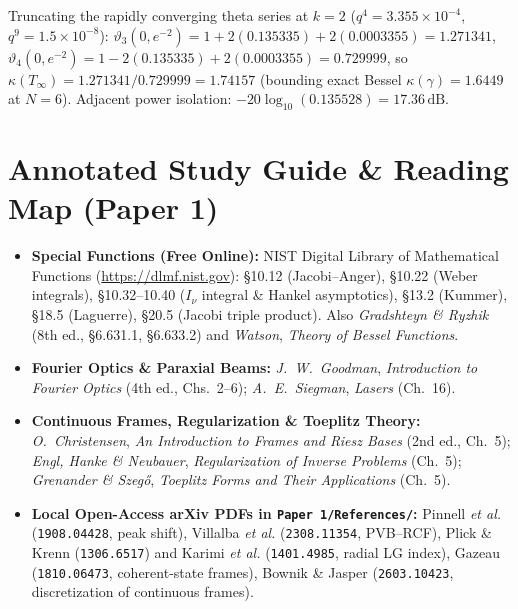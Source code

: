 \documentclass[10pt,letterpaper]{article}
\numberwithin{equation}{section}
\begin{document}
\begin{pencheck}[Hand Arithmetic at $\Delta R = 2.0\,w$ ($q = e^{-2} = 0.135335$)]
Truncating the rapidly converging theta series at $k = 2$ ($q^4 = 3.355\times 10^{-4}$, $q^9 = 1.5\times 10^{-8}$):
$\vartheta_3(0,e^{-2}) = 1 + 2(0.135335) + 2(0.0003355) = 1.271341$, $\vartheta_4(0,e^{-2}) = 1 - 2(0.135335) + 2(0.0003355) = 0.729999$, so $\kappa(T_\infty) = 1.271341/0.729999 = \mathbf{1.74157}$ (bounding exact Bessel $\kappa(\gamma) = 1.6449$ at $N=6$). Adjacent power isolation: $-20\log_{10}(0.135528) = \mathbf{17.36\,\mathrm{dB}}$.
\end{pencheck}

\section*{Annotated Study Guide \& Reading Map (Paper 1)}
\begin{itemize}[leftmargin=1.4em,itemsep=2pt]
  \item \textbf{Special Functions (Free Online):} NIST Digital Library of Mathematical Functions (\url{https://dlmf.nist.gov}): \S10.12 (Jacobi--Anger), \S10.22 (Weber integrals), \S10.32--10.40 ($I_\nu$ integral \& Hankel asymptotics), \S13.2 (Kummer), \S18.5 (Laguerre), \S20.5 (Jacobi triple product). Also \emph{Gradshteyn \& Ryzhik} (8th ed., \S6.631.1, \S6.633.2) and \emph{Watson}, \emph{Theory of Bessel Functions}.
  \item \textbf{Fourier Optics \& Paraxial Beams:} \emph{J.\ W.\ Goodman}, \emph{Introduction to Fourier Optics} (4th ed., Chs.~2--6); \emph{A.\ E.\ Siegman}, \emph{Lasers} (Ch.~16).
  \item \textbf{Continuous Frames, Regularization \& Toeplitz Theory:} \emph{O.\ Christensen}, \emph{An Introduction to Frames and Riesz Bases} (2nd ed., Ch.~5); \emph{Engl, Hanke \& Neubauer}, \emph{Regularization of Inverse Problems} (Ch.~5); \emph{Grenander \& Szeg\H{o}}, \emph{Toeplitz Forms and Their Applications} (Ch.~5).
  \item \textbf{Local Open-Access arXiv PDFs in \texttt{Paper 1/References/}:} Pinnell \emph{et al.} (\texttt{1908.04428}, peak shift), Villalba \emph{et al.} (\texttt{2308.11354}, PVB--RCF), Plick \& Krenn (\texttt{1306.6517}) and Karimi \emph{et al.} (\texttt{1401.4985}, radial LG index), Gazeau (\texttt{1810.06473}, coherent-state frames), Bownik \& Jasper (\texttt{2603.10423}, discretization of continuous frames).
\end{itemize}
\end{document}
